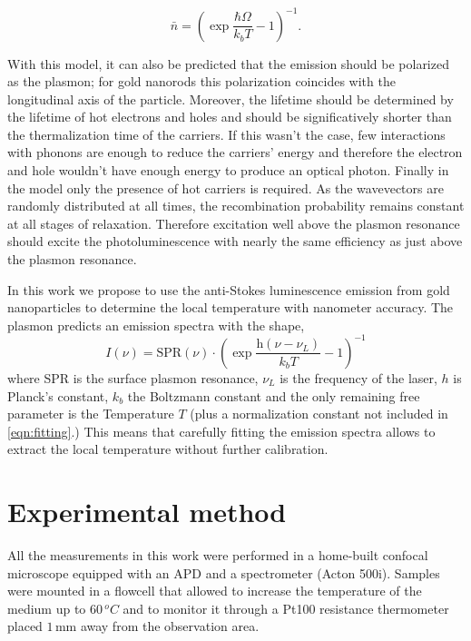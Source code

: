 \documentclass[journal=nalefd,manuscript=letter]{achemso}
\newcommand{\mm}{\ensuremath{\,\textrm{mm}}}
\begin{document}
\begin{equation}
	\bar{n}=\left(\exp\frac{\hbar\Omega}{k_bT}-1\right)^{-1}.
\end{equation}

With this model, it can also be predicted that the emission should be polarized
as the plasmon; for gold nanorods this polarization coincides with the
longitudinal axis of the particle. Moreover, the lifetime should be determined
by the lifetime of hot electrons and holes and should be significatively shorter
than the thermalization time of the carriers. If this wasn't the case, few
interactions with phonons are enough to reduce the carriers' energy and
therefore the electron and hole wouldn't have enough energy to produce an
optical photon. Finally in the model only the presence of hot carriers is
required. As the wavevectors are randomly distributed at all times, the
recombination probability remains constant at all stages of relaxation.
Therefore excitation well above the plasmon resonance should excite the
photoluminescence with nearly the same efficiency as just above the plasmon
resonance. 

In this work we propose to use the anti-Stokes luminescence emission from gold
nanoparticles to determine the local temperature with nanometer accuracy. The
plasmon predicts an emission spectra with the shape,
\begin{equation}\label{eqn:fitting}
	I(\nu) =
	\textrm{SPR}(\nu)\cdot\left(\exp\frac{\textrm{h}(\nu-\nu_L)}{k_bT}-1\right)^{-1}
\end{equation}
where SPR is the surface plasmon resonance, $\nu_L$ is the frequency of the
laser, $h$ is Planck's constant, $k_b$ the Boltzmann constant and the only
remaining free parameter is the Temperature $T$ (plus a normalization constant
not included in \ref{eqn:fitting}.) This means that carefully fitting the
emission spectra allows to extract the local temperature without further
calibration.

\section{Experimental method}
All the measurements in this work were performed in a home-built confocal
microscope equipped with an APD and a spectrometer (Acton 500i). Samples were
mounted in a flowcell that allowed to increase the temperature of the medium up
to $60\,^oC$ and to monitor it through a Pt100 resistance thermometer placed
$1\mm$ away from the observation area.
\end{document}
